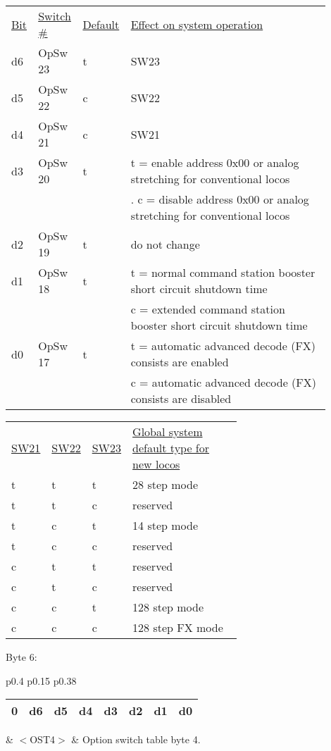 \begin{tabular}{p{0.05\linewidth} p{0.125\linewidth} p{0.1\linewidth} p{0.625\linewidth}} 
\underline{Bit} & \underline{Switch \#} & \underline{Default} & \underline{Effect on system operation}\\
d6 & OpSw 23 & t & SW23\\
d5 & OpSw 22 & c & SW22\\ 
d4 & OpSw 21 & c & SW21\\
d3 & OpSw 20 & t & t = enable address 0x00 or analog stretching for conventional locos\\
&&&. c = disable address 0x00 or analog stretching for conventional locos\\
d2 & OpSw 19 & t & do not change\\
d1 & OpSw 18 & t & t = normal command station booster short circuit shutdown time\\
&&& c = extended command station booster short circuit shutdown time\\
d0 & OpSw 17 & t & t = automatic advanced decode (FX) consists are enabled\\
&&& c = automatic advanced decode (FX) consists are disabled\\
\end{tabular}

\begin{tabular}{p{0.05\linewidth} p{0.05\linewidth} p{0.05\linewidth} p{0.5\linewidth}} 
\underline{SW21} & \underline{SW22} & \underline{SW23} & \underline{Global system default type for new locos}\\
t & t & t & 28 step mode\\
t & t & c & reserved\\
t & c & t & 14 step mode\\
t & c & c & reserved\\
c & t & t & reserved\\
c & t & c & reserved\\
c & c & t & 128 step mode\\
c & c & c & 128 step FX mode\\
\end{tabular}

Byte 6:

\begin{tabular}{p{0.4\linewidth} p{0.15\linewidth} p{0.38\linewidth}} 

\begin{tabular}{|p{0.3cm}|p{0.3cm}|p{0.3cm}|p{0.3cm}|p{0.3cm}|p{0.3cm}|p{0.3cm}|p{0.3cm}|}
\hline
0 & d6 & d5 & d4 & d3 & d2 & d1 & d0\\
\hline
\end{tabular}
& $<$OST4$>$ & Option switch table byte 4.\\
\end{tabular}

